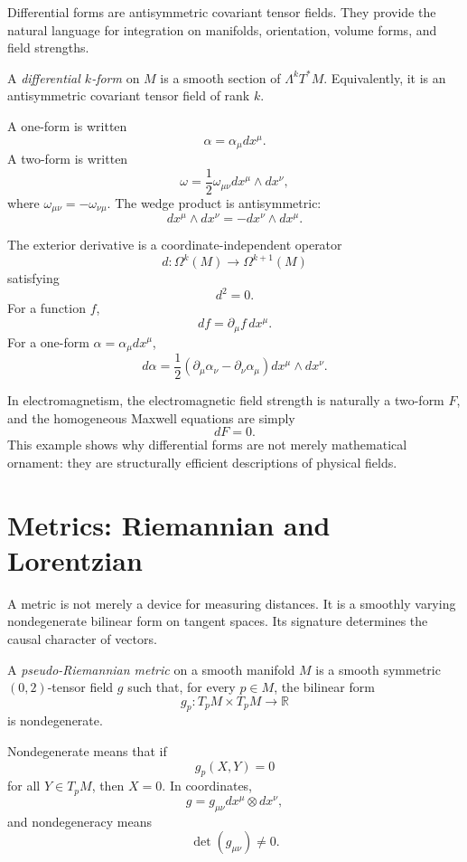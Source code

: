 Differential forms are antisymmetric covariant tensor fields. They provide the
natural language for integration on manifolds, orientation, volume forms, and
field strengths.

\begin{definitionbox}
A \emph{differential \(k\)-form} on \(M\) is a smooth section of
\(\Lambda^kT^*M\). Equivalently, it is an antisymmetric covariant tensor field
of rank \(k\).
\end{definitionbox}

A one-form is written
\[
\alpha=\alpha_\mu dx^\mu.
\]
A two-form is written
\[
\omega=\frac{1}{2}\omega_{\mu\nu}dx^\mu\wedge dx^\nu,
\]
where \(\omega_{\mu\nu}=-\omega_{\nu\mu}\). The wedge product is antisymmetric:
\[
dx^\mu\wedge dx^\nu=-dx^\nu\wedge dx^\mu.
\]

The exterior derivative is a coordinate-independent operator
\[
d:\Omega^k(M)\to \Omega^{k+1}(M)
\]
satisfying
\[
d^2=0.
\]
For a function \(f\),
\[
df=\partial_\mu f\,dx^\mu.
\]
For a one-form \(\alpha=\alpha_\mu dx^\mu\),
\[
d\alpha=\frac{1}{2}(\partial_\mu\alpha_\nu-
\partial_\nu\alpha_\mu)dx^\mu\wedge dx^\nu.
\]

In electromagnetism, the electromagnetic field strength is naturally a two-form
\(F\), and the homogeneous Maxwell equations are simply
\[
dF=0.
\]
This example shows why differential forms are not merely mathematical ornament:
they are structurally efficient descriptions of physical fields.

\clearpage

\section{Metrics: Riemannian and Lorentzian}

A metric is not merely a device for measuring distances. It is a smoothly varying
nondegenerate bilinear form on tangent spaces. Its signature determines the
causal character of vectors.

\begin{definitionbox}
A \emph{pseudo-Riemannian metric} on a smooth manifold \(M\) is a smooth
symmetric \((0,2)\)-tensor field \(g\) such that, for every \(p\in M\), the
bilinear form
\[
g_p:T_pM\times T_pM\to \mathbb{R}
\]
is nondegenerate.
\end{definitionbox}

Nondegenerate means that if
\[
g_p(X,Y)=0
\]
for all \(Y\in T_pM\), then \(X=0\). In coordinates,
\[
g=g_{\mu\nu}dx^\mu\otimes dx^\nu,
\]
and nondegeneracy means
\[
\det(g_{\mu\nu})\neq 0.
\]

